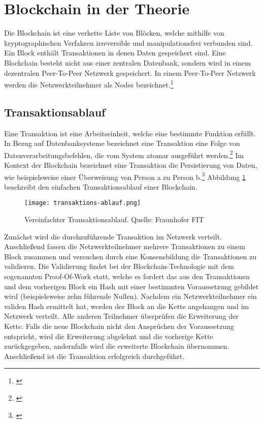 \section{Blockchain in der Theorie}
\label{sec:Theorie}
Die Blockchain ist eine verkette Liste von Blöcken, welche mithilfe von kryptographischen Verfahren irreversible und manipulationsfrei verbunden sind. Ein Block enthält Transaktionen in denen Daten gespeichert sind. Eine Blockchain besteht nicht aus einer zentralen Datenbank, sondern wird in einem dezentralen Peer-To-Peer Netzwerk gespeichert. In einem Peer-To-Peer Netzwerk werden die Netzwerkteilnehmer als Nodes bezeichnet.\footnote{\cite[S.~5]{Korzun.2013}}


\subsection{Transaktionsablauf}
\label{subsec:transaktionsablauf}
Eine Transaktion ist eine Arbeitseinheit, welche eine bestimmte Funktion erf{\"u}llt. In Bezug auf Datenbanksysteme bezeichnet eine Transaktion eine Folge von Datenverarbeitungsbefehlen, die vom System atomar ausgef{\"u}hrt werden.\footnote{\cite[S.~301]{Kemper.2006}} Im Kontext der Blockchain bezeichnet eine Transaktion die Persistierung von Daten, wie beispielsweise einer {\"U}berweisung von Person a zu Person b.\footnote{\cite[S.~2]{SatoshiNakamoto.}} Abbildung \ref{fig:transaktionsablauf} beschreibt den einfachen Transaktionsablauf einer Blockchain.

\begin{figure}[h]
	\texttt{[image: transaktions-ablauf.png]}
	\caption{Vereinfachter Transaktionsablauf. Quelle: Fraunhofer FIT}
	\label{fig:transaktionsablauf}
\end{figure}

Zunächst wird die durchzuführende Transaktion im Netzwerk verteilt. Anschließend fassen die Netzwerkteilnehmer mehrere Transaktionen zu einem Block zusammen und versuchen durch eine Konsensbildung die Transaktionen zu validieren. Die Validierung findet bei der Blockchain-Technologie mit dem sogenannten Proof-Of-Work statt, welche es fordert das aus den Transaktionen und dem vorherigen Block ein Hash mit einer bestimmten Voraussetzung gebildet wird (beispielsweise zehn führende Nullen). Nachdem ein Netzwerkteilnehmer ein validen Hash ermittelt hat, werden der Block an die Kette angehangen und im Netzwerk verteilt. Alle anderen Teilnehmer überprüfen die Erweiterung der Kette. Falls die neue Blockchain nicht den Ansprüchen der Voraussetzung entspricht, wird die Erweiterung abgelehnt und die vorherige Kette zurückgegeben, andernfalls wird die erweiterte Blockchain übernommen. Anschließend ist die Transaktion erfolgreich durchgeführt.


